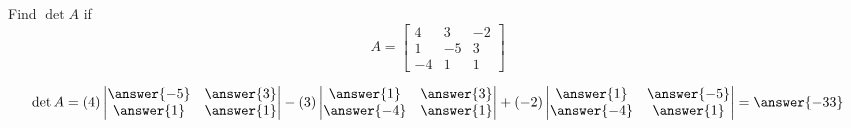 \documentclass{ximera}
\begin{document}
\begin{example}
Find $\det{A}$ if 
$$A=\begin{bmatrix}4&3&-2\\1&-5&3\\-4&1&1\end{bmatrix}$$
\begin{explanation}
$$
\det{A}=(4)\begin{vmatrix}\answer{-5}&\answer{3}\\\answer{1}&\answer{1}\end{vmatrix}-(3)\begin{vmatrix}\answer{1}&\answer{3}\\\answer{-4}&\answer{1}\end{vmatrix}+(-2)\begin{vmatrix}\answer{1}&\answer{-5}\\\answer{-4}&\answer{1}\end{vmatrix}
=\answer{-33}
$$
\end{explanation}
\end{example}
\end{document}
